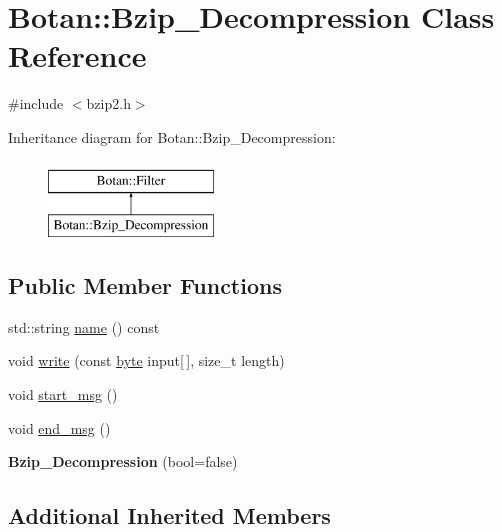 \hypertarget{classBotan_1_1Bzip__Decompression}{\section{Botan\-:\-:Bzip\-\_\-\-Decompression Class Reference}
\label{classBotan_1_1Bzip__Decompression}
}


{\ttfamily \#include $<$bzip2.\-h$>$}

Inheritance diagram for Botan\-:\-:Bzip\-\_\-\-Decompression\-:\begin{figure}[H]
\begin{center}
\leavevmode
\includegraphics[height=2.000000cm]{classBotan_1_1Bzip__Decompression}
\end{center}
\end{figure}
\subsection*{Public Member Functions}
\begin{DoxyCompactItemize}
\item 
std\-::string \hyperlink{classBotan_1_1Bzip__Decompression_a67aeb59b99dace11cdd6f4ab1b05b274}{name} () const 
\item 
void \hyperlink{classBotan_1_1Bzip__Decompression_a3623a775f34f6c7f056a6b1277667b40}{write} (const \hyperlink{namespaceBotan_a7d793989d801281df48c6b19616b8b84}{byte} input\mbox{[}$\,$\mbox{]}, size\-\_\-t length)
\item 
void \hyperlink{classBotan_1_1Bzip__Decompression_a8044ca19ddd25eced2d4fbd2100e73a0}{start\-\_\-msg} ()
\item 
void \hyperlink{classBotan_1_1Bzip__Decompression_a468b4c73700559238c314d6e37829d04}{end\-\_\-msg} ()
\item 
\hypertarget{classBotan_1_1Bzip__Decompression_ad4db0cd4374c2e8829ddaabb81703a1d}{{\bfseries Bzip\-\_\-\-Decompression} (bool=false)}\label{classBotan_1_1Bzip__Decompression_ad4db0cd4374c2e8829ddaabb81703a1d}

\end{DoxyCompactItemize}
\subsection*{Additional Inherited Members}


